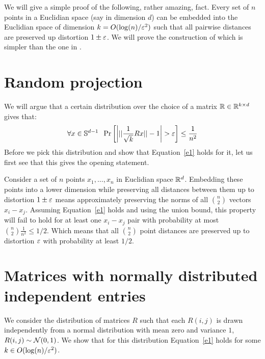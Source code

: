 

We will give a simple proof of the following, rather amazing, fact. Every set of $n$ points 
in a Euclidian space (say in dimension $d$) can be embedded into the Euclidian space of 
dimension $k = O(\log(n)/\varepsilon^2)$ such that all pairwise distances are preserved up distortion $1\pm \varepsilon$.
We will prove the construction of \cite{DasGuptaGupta99} which is simpler than the one in \cite{JL84}.

\section*{Random projection}
We will argue that a certain distribution over the choice of a matrix ${\mathbb{R}} \in {\mathbb{R}}^{k \times d}$ gives that:
\begin{equation}
\label{e1}
\forall x \in {\mathbb{S}}^{d-1} \;\; \Pr\left[ \left| ||\frac{1}{\sqrt{k}}Rx|| - 1 \right| > \varepsilon \right] \le \frac{1}{n^2} 
\end{equation}
Before we pick this distribution and show that Equation~\ref{e1} holds for it, let us first see
that this gives the opening statement. 

Consider a set of $n$ points $x_1,\ldots, x_n$ in Euclidian space ${\mathbb{R}}^d$. Embedding these points
into a lower dimension while preserving all distances between
them up to distortion $1\pm \varepsilon$ means approximately preserving the norms of all 
${n \choose 2}$ vectors $x_i - x_j$. Assuming Equation~\ref{e1} holds and using the union 
bound, this property will fail to hold for at least one $x_i - x_j$ pair with probability at most ${n \choose 2}\frac{1}{n^2} \le 1/2$.
Which means that all ${n \choose 2}$ point distances are preserved up to distortion $\varepsilon$ with probability at least $1/2$.


\section{Matrices with normally distributed independent entries}
We consider the distribution of matrices $R$ such that each $R(i,j)$ is drawn independently from  a
normal distribution with mean zero and variance $1$, $R(i,j) \sim {\mathcal{N}}(0,1)$. We show that for this
distribution Equation~\ref{e1} holds for some $k \in O(\log(n)/\varepsilon^2)$.

